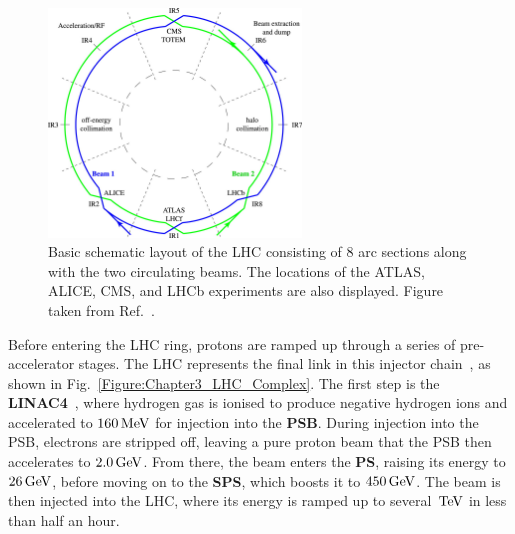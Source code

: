 \begin{figure}[!htbp]
\centering
\includegraphics[width= 0.6\textwidth]{Figures/Chapter3/LHC_BasicLayout.jpg}
\caption[Basic schematic layout of the Large Hadron Collider]{Basic schematic layout of the \ac{LHC} consisting of 8 arc sections along with the two circulating beams. The locations of the ATLAS, ALICE, \ac{CMS}, and LHCb experiments are also displayed. Figure taken from Ref.~\cite{LHC_BasicLayout}.}
\label{Figure:Chapter3_LHC_BasicLayout}
\end{figure}

\newpage
Before entering the \ac{LHC} ring, protons are ramped up through a series of pre-accelerator stages. The \ac{LHC} represents the final link in this injector chain~\cite{LHC_InjectorComplex}, as shown in Fig.~\ref{Figure:Chapter3_LHC_Complex}. The first step is the \textbf{\ac{LINAC4}}~\cite{LINAC4}, where hydrogen gas is ionised to produce negative hydrogen ions and accelerated to $160\,\text{Me\hspace{-.08em}V}$ for injection into the \textbf{\ac{PSB}}. During injection into the \ac{PSB}, electrons are stripped off, leaving a pure proton beam that the \ac{PSB} then accelerates to $2.0\,\text{Ge\hspace{-.08em}V}$. From there, the beam enters the \textbf{\ac{PS}}, raising its energy to $26\,\text{Ge\hspace{-.08em}V}$, before moving on to the \textbf{\ac{SPS}}, which boosts it to $450\,\text{Ge\hspace{-.08em}V}$. The beam is then injected into the \ac{LHC}, where its energy is ramped up to several $\,\text{Te\hspace{-.08em}V}$ in less than half an hour.

